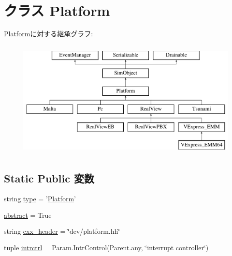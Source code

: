 \hypertarget{classPlatform_1_1Platform}{
\section{クラス Platform}
\label{classPlatform_1_1Platform}
}
Platformに対する継承グラフ:\begin{figure}[H]
\begin{center}
\leavevmode
\includegraphics[height=6cm]{classPlatform_1_1Platform}
\end{center}
\end{figure}
\subsection*{Static Public 変数}
\begin{DoxyCompactItemize}
\item 
string \hyperlink{classPlatform_1_1Platform_acce15679d830831b0bbe8ebc2a60b2ca}{type} = '\hyperlink{classPlatform_1_1Platform}{Platform}'
\item 
\hyperlink{classPlatform_1_1Platform_a17fa61ac3806b481cafee5593b55e5d0}{abstract} = True
\item 
string \hyperlink{classPlatform_1_1Platform_a17da7064bc5c518791f0c891eff05fda}{cxx\_\-header} = \char`\"{}dev/platform.hh\char`\"{}
\item 
tuple \hyperlink{classPlatform_1_1Platform_af66276cad0c0f97f0e6b4c82caec5776}{intrctrl} = Param.IntrControl(Parent.any, \char`\"{}interrupt controller\char`\"{})
\end{DoxyCompactItemize}


